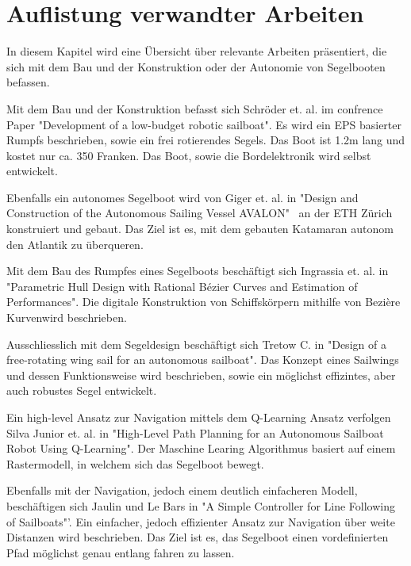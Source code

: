 

\chapter{Auflistung verwandter Arbeiten}
\label{chap:literaturübersicht}

In diesem Kapitel wird eine Übersicht über relevante Arbeiten präsentiert, die sich mit dem Bau und der Konstruktion oder der Autonomie von Segelbooten befassen.

Mit dem Bau und der Konstruktion befasst sich Schröder et. al. im confrence Paper "Development of a low-budget robotic sailboat". Es wird ein EPS basierter Rumpfs beschrieben, sowie ein frei rotierendes Segels. Das Boot ist 1.2m lang und kostet nur ca. 350 Franken. Das Boot, sowie die Bordelektronik wird selbst entwickelt. \cite{10.1007/978-3-319-02276-5_2}
 
Ebenfalls ein autonomes Segelboot wird von Giger et. al. in "Design and Construction of the Autonomous Sailing Vessel AVALON" \ an der ETH Zürich konstruiert und gebaut. Das Ziel ist es, mit dem gebauten Katamaran autonom den Atlantik zu überqueren. \cite{giger_design_2009}

Mit dem Bau des Rumpfes eines Segelboots beschäftigt sich Ingrassia et. al. in "Parametric Hull Design with Rational Bézier Curves and Estimation of Performances". Die digitale Konstruktion von Schiffskörpern  mithilfe von Bezière Kurvenwird  beschrieben. \cite{ingrassia_parametric_2021}

Ausschliesslich mit dem Segeldesign beschäftigt sich Tretow C. in "Design of a free-rotating wing sail for an autonomous sailboat". Das Konzept eines Sailwings und dessen Funktionsweise wird beschrieben, sowie ein möglichst effizintes, aber auch robustes Segel entwickelt. \cite{Tretow2017DesignOA}

Ein high-level Ansatz zur Navigation mittels dem Q-Learning Ansatz verfolgen Silva Junior et. al. in "High-Level Path Planning for an Autonomous Sailboat Robot Using Q-Learning". Der Maschine Learing Algorithmus basiert auf einem Rastermodell, in welchem sich das Segelboot bewegt. \cite{silva_junior_high-level_2020}

Ebenfalls mit der Navigation, jedoch einem deutlich einfacheren Modell, beschäftigen sich Jaulin und Le Bars in "{}A{} Simple Controller for Line Following of Sailboats"'. Ein einfacher, jedoch effizienter Ansatz zur Navigation über weite Distanzen wird beschrieben. Das Ziel ist es, das Segelboot einen vordefinierten Pfad möglichst genau entlang fahren zu lassen. \cite{sauze_simple_2013}

